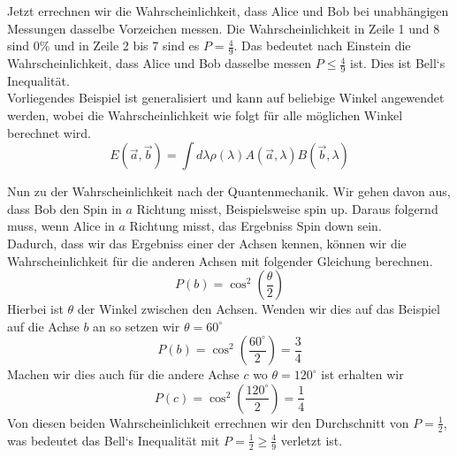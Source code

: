 Jetzt errechnen wir die Wahrscheinlichkeit, dass Alice und Bob bei unabhängigen Messungen dasselbe Vorzeichen messen. Die Wahrscheinlichkeit in Zeile 1 und 8 sind $0\%$ und in Zeile 2 bis 7 sind es $P = \frac{4}{9}$.
Das bedeutet nach Einstein die Wahrscheinlichkeit, dass Alice und Bob dasselbe messen $P \leq \frac{4}{9}$ ist. Dies ist Bell`s Inequalität.\\
Vorliegendes Beispiel ist generalisiert und kann auf beliebige Winkel angewendet werden, wobei die Wahrscheinlichkeit wie folgt für alle möglichen Winkel berechnet wird.
\begin{equation}
    E(\overrightarrow{a}, \overrightarrow{b}) = \int d\lambda \rho(\lambda) A(\overrightarrow{a}, \lambda) B(\overrightarrow{b}, \lambda)
\end{equation}

Nun zu der Wahrscheinlichkeit nach der Quantenmechanik. Wir gehen davon aus, dass Bob den Spin in $a$ Richtung misst, Beispielsweise spin up. Daraus folgernd muss, wenn Alice in $a$ Richtung misst, das Ergebniss Spin down sein.\\
Dadurch, dass wir das Ergebniss einer der Achsen kennen, können wir die Wahrscheinlichkeit für die anderen Achsen mit folgender Gleichung berechnen.
\begin{equation}
    P(b) = \cos^2(\frac{\theta}{2})
\end{equation}
Hierbei ist $\theta$ der Winkel zwischen den Achsen. Wenden wir dies auf das Beispiel auf die Achse $b$ an so setzen wir $\theta = 60^\circ$
\begin{equation}
    P(b) = \cos^2(\frac{60^\circ}{2}) = \frac{3}{4}
\end{equation}
Machen wir dies auch für die andere Achse $c$ wo $\theta = 120^\circ$ ist erhalten wir
\begin{equation}
    P(c) = \cos^2(\frac{120^\circ}{2}) = \frac{1}{4}
\end{equation}
Von diesen beiden Wahrscheinlichkeit errechnen wir den Durchschnitt von $P = \frac{1}{2}$, was bedeutet das Bell`s Inequalität mit $P = \frac{1}{2} \ge \frac{4}{9}$ verletzt ist.\\

